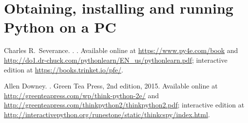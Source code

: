 \documentclass[11pt,a4paper]{article}
\begin{document}
\section{Obtaining, installing and running Python on a PC}
\label{sec:obta-inst-runn}


%

\begin{thebibliography}{1}

Charles R.\ Severance.
.
.
\newblock Available online at \url{https://www.py4e.com/book} and
 \url{http://do1.dr-chuck.com/pythonlearn/EN_us/pythonlearn.pdf}; interactive edition at
 \url{https://books.trinket.io/pfe/}.

Allen Downey.
.
\newblock Green Tea Press, 2nd edition, 2015.
\newblock Available online at \url{http://greenteapress.com/wp/think-python-2e/} and
 \url{http://greenteapress.com/thinkpython2/thinkpython2.pdf}; interactive edition at
 \url{http://interactivepython.org/runestone/static/thinkcspy/index.html}.

\end{thebibliography}
\end{document}
